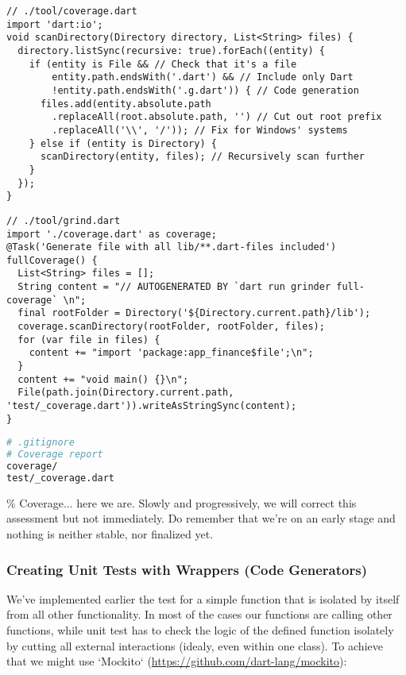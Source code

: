 \begin{lstlisting}
// ./tool/coverage.dart
import 'dart:io';
void scanDirectory(Directory directory, List<String> files) {
  directory.listSync(recursive: true).forEach((entity) {
    if (entity is File && // Check that it's a file
        entity.path.endsWith('.dart') && // Include only Dart
        !entity.path.endsWith('.g.dart')) { // Code generation
      files.add(entity.absolute.path
        .replaceAll(root.absolute.path, '') // Cut out root prefix
        .replaceAll('\\', '/')); // Fix for Windows' systems
    } else if (entity is Directory) {
      scanDirectory(entity, files); // Recursively scan further
    }
  });
}
\end{lstlisting}

\begin{lstlisting}
// ./tool/grind.dart
import './coverage.dart' as coverage;
@Task('Generate file with all lib/**.dart-files included')
fullCoverage() {
  List<String> files = [];
  String content = "// AUTOGENERATED BY `dart run grinder full-coverage` \n";
  final rootFolder = Directory('${Directory.current.path}/lib');
  coverage.scanDirectory(rootFolder, rootFolder, files);
  for (var file in files) {
    content += "import 'package:app_finance$file';\n";
  }
  content += "void main() {}\n";
  File(path.join(Directory.current.path, 'test/_coverage.dart')).writeAsStringSync(content);
}
\end{lstlisting}

\begin{lstlisting}[language=bash]
# .gitignore
# Coverage report
coverage/
test/_coverage.dart
\end{lstlisting}

\% Coverage... here we are. Slowly and progressively, we will correct this assessment but not immediately.
Do remember that we're on an early stage and nothing is neither stable, nor finalized yet.


\subsubsection{Creating Unit Tests with Wrappers (Code Generators)}

We've implemented earlier the test for a simple function that is isolated by itself from all other functionality. 
In most of the cases our functions are calling other functions, while unit test has to check the logic of the defined 
function isolately by cutting all external interactions (idealy, even within one class). To achieve that we might
use `Mockito` (\href{https://github.com/dart-lang/mockito}{https://github.com/dart-lang/mockito}):

